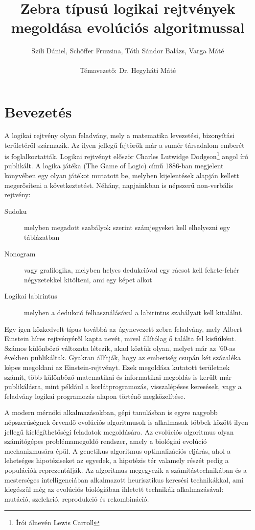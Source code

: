 \documentclass[12pt,a4paper,oneside]{report}
\author{Szili Dániel, Schöffer Fruzsina, Tóth Sándor Balázs, Varga Máté\\\ \\Témavezető: Dr. Hegyháti Máté}
\title{Zebra típusú logikai rejtvények megoldása evolúciós algoritmussal}
\begin{document}
\maketitle

\tableofcontents

\chapter{Bevezetés} %
	A logikai rejtvény olyan feladvány, mely a matematika levezetési, bizonyítási területéről származik.
    Az ilyen jellegű fejtörők már a sumér társadalom emberét is foglalkoztatták. Logikai rejtvényt először Charles Lutwidge Dodgson\footnote{Írói álnevén Lewis Carroll} angol író publikált.
    A logika játéka (The Game of Logic) című 1886-ban megjelent könyvében egy olyan játékot mutatott be, melyben kijelentések alapján kellett megerősíteni a következtetést\cite{thegameoflogic}.
    Néhány, napjainkban is népszerű non-verbális rejtvény:
	\begin{description}
        \item[Sudoku] melyben megadott szabályok szerint számjegyeket kell elhelyezni egy táblázatban
        \item[Nonogram] vagy grafilogika, melyben helyes dedukcióval egy rácsot kell fekete-fehér négyzetekkel kitölteni, ami egy képet alkot
        \item[Logikai labirintus] melyben a dedukció felhasználásával a labirintus szabályait kell kitalálni.
	\end{description}

	Egy igen közkedvelt típus továbbá az úgynevezett zebra feladvány, mely Albert Einstein híres rejtvényéről kapta nevét, mivel állítólag ő találta fel kisfiúként.
    Számos különböző változata létezik, akad köztük olyan, melyet már az ’60-as években publikáltak.
    Gyakran állítják, hogy az emberiség csupán két százaléka képes megoldani az Einstein-rejtvényt.
    Ezek megoldása kutatott területnek számít, több különböző matematikai és informatikai megoldás is került már publikálásra, mint például a korlátprogramozás, visszalépéses keresések, vagy a feladvány logikai programozás alapon történő megközelítése.

	A modern mérnöki alkalmazásokban, gépi tanulásban is egyre nagyobb népszerűségnek örvendő evolúciós algoritmusok is alkalmasak többek között ilyen jellegű kielégíthetőségi feladatok megoldására.
    Az evolúciós algoritmus olyan számítógépes problémamegoldó rendszer, amely a biológiai evolúció mechanizmusára épül.
    A genetikus algoritmus optimalizációs eljárás, ahol a lehetséges hipotéziseket az egyedek, a hipotézis tér valamely részét pedig a populációk reprezentálják.
    Az algoritmus megegyezik a számítástechnikában és a mesterséges intelligenciában alkalmazott heurisztikus keresési technikákkal, ami kiegészül még az evolúciós biológiában ihletett technikák alkalmazásával: mutáció, szelekció, reprodukció és rekombináció.
\end{document}
